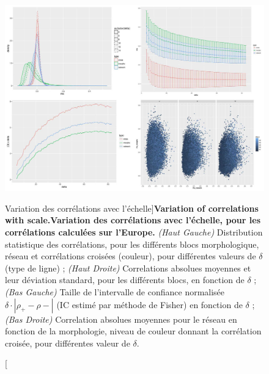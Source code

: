 \begin{figure}
\includegraphics[width=\linewidth]{Figures/Final/4-1-3-fig-staticcorrs-corrsdistrib}
\caption[Variation of correlations with scale][Variation des corrélations avec l'échelle]{\textbf{Variation of correlations with scale.}\label{fig:staticcorrs:corrsdistrib}}{\textbf{Variation des corrélations avec l'échelle, pour les corrélations calculées sur l'Europe.} \textit{(Haut Gauche)} Distribution statistique des corrélations, pour les différents blocs morphologique, réseau et corrélations croisées (couleur), pour différentes valeurs de $\delta$ (type de ligne) ; \textit{(Haut Droite)} Correlations absolues moyennes et leur déviation standard, pour les différents blocs, en fonction de $\delta$ ; \textit{(Bas Gauche)} Taille de l'intervalle de confiance normalisée $\delta\cdot \left|\rho_+ - \rho -\right|$ (IC estimé par méthode de Fisher) en fonction de $\delta$ ; \textit{(Bas Droite)} Correlation absolues moyennes pour le réseau en fonction de la morphologie, niveau de couleur donnant la corrélation croisée, pour différentes valeur de $\delta$.\label{fig:staticcorrs:corrsdistrib}}
\end{figure}




